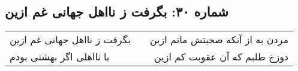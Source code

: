 \begin{center}
\section*{شماره ۳۰: بگرفت ز نااهل جهانی غم ازین}
\label{sec:030}
\begin{longtable}{l p{0.5cm} r}
بگرفت ز نااهل جهانی غم ازین
&&
مردن به از آنکه صحبتش ماتم ازین
\\
با نااهلی اگر بهشتی بودم
&&
دوزخ طلبم که آن عقوبت کم ازین
\\
\end{longtable}
\end{center}
